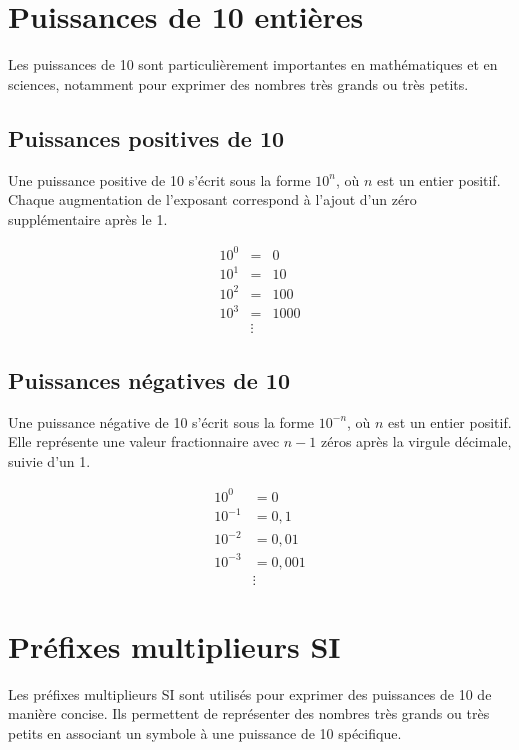 \documentclass{article}
\begin{document}
\section{Puissances de 10 entières}

Les puissances de 10 sont particulièrement importantes en mathématiques et en sciences,
notamment pour exprimer des nombres très grands ou très petits.

\subsection{Puissances positives de 10}

 Une puissance positive de 10 s'écrit sous la forme \( 10^n \), où \( n \) est un entier positif. Chaque augmentation de l'exposant correspond à l'ajout d'un zéro supplémentaire après le 1.

 \[
\begin{aligned}
10^0 &= &0 \\
10^1 &= &10 \\
10^2 &= &100 \\
10^3 &= &1000 \\
&\vdots
\end{aligned}
\]
\vfill

\subsection{Puissances négatives de 10}

 Une puissance négative de 10 s'écrit sous la forme \( 10^{-n} \), où \( n \) est un entier positif. Elle représente une valeur fractionnaire avec \( n-1 \) zéros après la virgule décimale, suivie d'un 1.

\begin{align*}
10^{0} &= 0 \\
10^{-1} &= 0,1 \\
10^{-2} &= 0,01 \\
10^{-3} &= 0,001 \\
&\vdots
\end{align*}
\vfill

\section{Préfixes multiplieurs SI}

Les préfixes multiplieurs SI sont utilisés pour exprimer des puissances de 10 de manière concise.
Ils permettent de représenter des nombres très grands ou très petits en associant 
un symbole à une puissance de 10 spécifique.
\end{document}
